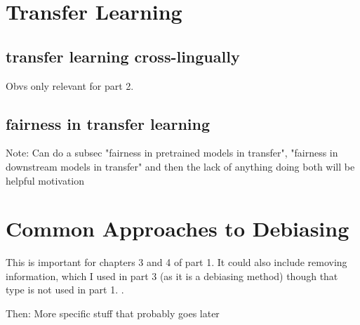 \section{Transfer Learning}
\subsection{transfer learning  cross-lingually}
Obvs only relevant for part 2.
\subsection{fairness in transfer learning}

Note: Can do a subsec "fairness in pretrained models in transfer", "fairness in downstream models in transfer" and then the lack of anything doing both will be helpful motivation



\section{Common Approaches to Debiasing}
This is important for chapters 3 and 4 of part 1. It could also include removing information, which I used in part 3 (as it is a debiasing method) though that type is not used in part 1. 
.

Then: More specific stuff that probably goes later
